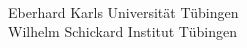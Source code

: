 


%


\thispagestyle{empty}



\begin{verbatim}


\end{verbatim}

\begin{center}
\Large{Eberhard Karls Universität Tübingen}\\
\small Wilhelm Schickard Institut Tübingen\\
\end{center}


